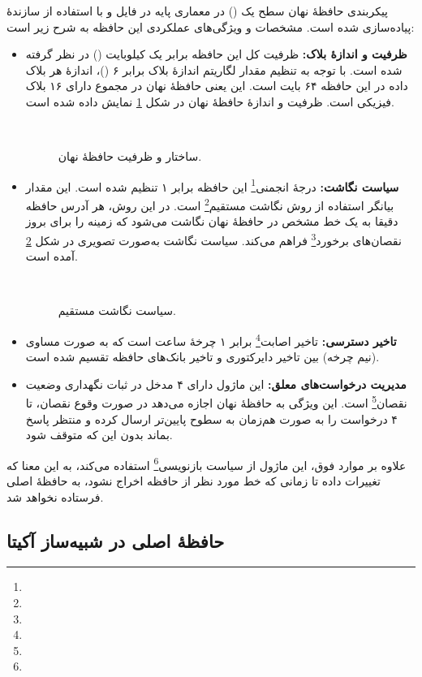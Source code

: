 پیکربندی حافظهٔ نهان سطح یک () در معماری پایه در فایل  و با استفاده از سازندهٔ  پیاده‌سازی شده است. مشخصات و ویژگی‌های عملکردی این حافظه به شرح زیر است:
\begin{itemize}
	\item \textbf{ظرفیت و اندازهٔ بلاک:} ظرفیت کل این حافظه برابر یک کیلوبایت () در نظر گرفته شده است. با توجه به تنظیم مقدار لگاریتم اندازهٔ بلاک برابر ۶ ()، اندازهٔ هر بلاک داده در این حافظه ۶۴ بایت است. این یعنی حافظهٔ نهان در مجموع دارای ۱۶ بلاک فیزیکی است. ظرفیت و اندازهٔ حافظهٔ نهان در شکل \ref{cache} نمایش داده شده است.
	

\begin{figure}[ht]
	‫
	\caption{ساختار و ظرفیت حافظهٔ نهان.}
	\label{cache}
\end{figure}

	\item \textbf{سیاست نگاشت:} درجهٔ انجمنی\footnote{} این حافظه برابر ۱ تنظیم شده است. این مقدار بیانگر استفاده از روش نگاشت مستقیم\footnote{} است. در این روش، هر آدرس حافظه دقیقا به یک خط مشخص در حافظهٔ نهان نگاشت می‌شود که زمینه را برای بروز نقصان‌های برخورد\footnote{} فراهم می‌کند. سیاست نگاشت به‌صورت تصویری در شکل \ref{mapping} آمده است.
	
\begin{figure}[ht]
	‫
	\caption{سیاست نگاشت مستقیم.}
	\label{mapping}
\end{figure}
	
	\item \textbf{تاخیر دسترسی:} تاخیر اصابت\footnote{} برابر ۱ چرخهٔ ساعت است که به صورت مساوی (نیم چرخه) بین تاخیر دایرکتوری و تاخیر بانک‌های حافظه تقسیم شده است.
	\item \textbf{مدیریت درخواست‌های معلق:} این ماژول دارای ۴ مدخل در ثبات نگهداری وضعیت نقصان\footnote{} است. این ویژگی به حافظهٔ نهان اجازه می‌دهد در صورت وقوع نقصان، تا ۴ درخواست را به صورت هم‌زمان به سطوح پایین‌تر ارسال کرده و منتظر پاسخ بماند بدون این که متوقف شود.
\end{itemize}
علاوه بر موارد فوق، این ماژول از سیاست بازنویسی\footnote{} استفاده می‌کند، به این معنا که تغییرات داده تا زمانی که خط مورد نظر از حافظه اخراج نشود، به حافظهٔ اصلی فرستاده نخواهد شد.

\subsection{حافظهٔ اصلی در شبیه‌ساز آکیتا}

